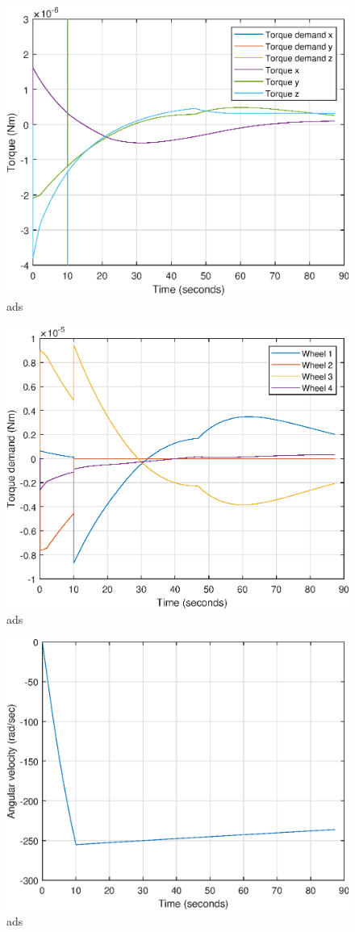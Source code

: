 \begin{figure}
	\centering
	\includegraphics[width=120mm]{figures/smooth3dtorque}
	\caption{ads}
\end{figure} 

\begin{figure}
	\centering
	\includegraphics[width=120mm]{figures/smooth_motor_torque}
	\caption{ads}
\end{figure} 

\begin{figure}
\centering
\includegraphics[width=120mm]{figures/smooth_omega_residual}
\caption{ads}
\end{figure} 